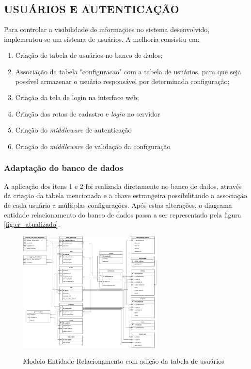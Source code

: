 \subsection{USUÁRIOS E AUTENTICAÇÃO}

Para controlar a visibilidade de informações no sistema desenvolvido, implementou-se um sistema de usuários. A melhoria consistiu em:

\begin{enumerate}
	\item Criação de tabela de usuários no banco de dados;
	\item Associação da tabela "configuracao" com a tabela de usuários, para que seja possível armazenar o usuário responsável por determinada configuração;
	\item Criação da tela de login na interface web;
	\item Criação das rotas de cadastro e \textit{login} no servidor
	\item Criação do \textit{middleware} de autenticação
	\item Criação do \textit{middleware} de validação da configuração
\end{enumerate}

\subsubsection{Adaptação do banco de dados}
A aplicação dos itens 1 e 2 foi realizada diretamente no banco de dados, através da criação da tabela mencionada e a chave estrangeira possibilitando a associação de cada usuário a múltiplas configurações. Após estas alterações, o diagrama entidade relacionamento do banco de dados passa a ser representado pela figura \ref{fig:er_atualizado}.

\begin{figure}[!htb]
	\centering
	\caption{Modelo Entidade-Relacionamento com adição da tabela de usuários}
	\includegraphics[width=0.65\textwidth]{./dados/figuras/er_horario_com_usuario}
	\label{fig:er_atualizado-uc}
\end{figure}

